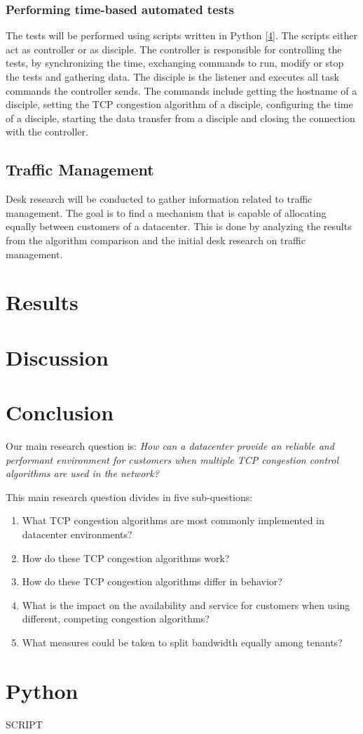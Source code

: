 \documentclass{article}
\begin{document}
		\subsubsection{Performing time-based automated tests}
		The tests will be performed using scripts written in Python [\ref{appendix:python}]. The scripts either act as controller or as disciple. The controller is responsible for controlling the tests, by synchronizing the time, exchanging commands to run, modify or stop the tests and gathering data. The disciple is the listener and executes all task commands the controller sends. The commands include getting the hostname of a disciple, setting the TCP congestion algorithm of a disciple, configuring the time of a disciple, starting the data transfer from a disciple and closing the connection with the controller.

	\subsection{Traffic Management}
	Desk research will be conducted to gather information related to traffic management. The goal is to find a mechanism that is capable of allocating equally between customers of a datacenter. This is done by analyzing the results from the algorithm comparison and the initial desk research on traffic management. 

\section{Results}


\section{Discussion}


\section{Conclusion}


Our main research question is:
{\it How can a datacenter provide an reliable and performant environment for
customers when multiple TCP congestion control algorithms are used in the
network?}

\vspace{0.5cm}

This main research question divides in five sub-questions:

\begin{enumerate}
	\item What TCP congestion algorithms are most commonly implemented in datacenter environments?
	\item How do these TCP congestion algorithms work?
	\item How do these TCP congestion algorithms differ in behavior?
	\item What is the impact on the availability and service for customers when using different, competing congestion algorithms?
	\item What measures could be taken to split bandwidth equally among tenants?
\end{enumerate}


\printbibliography

\appendix
\section{Python}
\label{appendix:python}
SCRIPT
\end{document}
